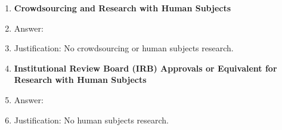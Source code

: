 \documentclass{article}
\begin{document}
\begin{enumerate}
\item {\bf Crowdsourcing and Research with Human Subjects}
    \item[] Answer: \answerNA{}
    \item[] Justification: No crowdsourcing or human subjects research.

\item {\bf Institutional Review Board (IRB) Approvals or Equivalent for Research with Human Subjects}
    \item[] Answer: \answerNA{}
    \item[] Justification: No human subjects research.

\end{enumerate}
\end{document}

